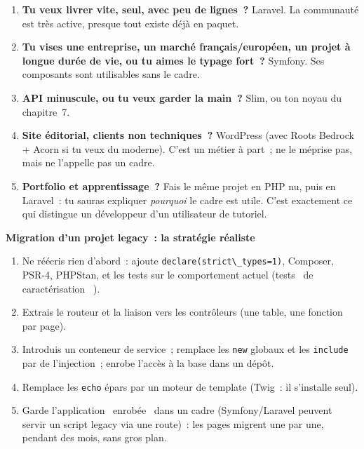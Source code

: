 \documentclass[12pt,a4paper,twoside,openright]{book}
\newcommand{\etape}[1]{\par\medskip\noindent\textbf{\large #1}\par\smallskip}
\begin{document}
\begin{enumerate}
  \item \textbf{Tu veux livrer vite, seul, avec peu de lignes~?} Laravel. La communaut\'e est tr\`es
        active, presque tout existe d\'ej\`a en paquet.
  \item \textbf{Tu vises une entreprise, un march\'e fran\c{c}ais/europ\'een, un projet \`a longue dur\'ee de
        vie, ou tu aimes le typage fort~?} Symfony. Ses composants sont utilisables sans le cadre.
  \item \textbf{API minuscule, ou tu veux garder la main~?} Slim, ou ton noyau du chapitre~7.
  \item \textbf{Site \'editorial, clients non techniques~?} WordPress (avec Roots Bedrock + Acorn si tu veux du moderne). C'est un m\'etier \`a part~; ne le m\'eprise pas, mais ne l'appelle pas un cadre.
  \item \textbf{Portfolio et apprentissage~?} Fais le m\^eme projet en PHP nu, puis en Laravel~: tu
        sauras expliquer \emph{pourquoi} le cadre est utile. C'est exactement ce qui distingue un
        d\'eveloppeur d'un utilisateur de tutoriel.
\end{enumerate}

\etape{Migration d'un projet legacy~: la strat\'egie r\'ealiste}
\begin{enumerate}
  \item Ne r\'e\'ecris rien d'abord~: ajoute \verb|declare(strict\_types=1)|, Composer, PSR-4,
        PHPStan, et les tests sur le comportement actuel (tests \og ~de caract\'erisation~ \fg{}).
  \item Extrais le routeur et la liaison vers les contr\^oleurs (une table, une fonction par page).
  \item Introduis un conteneur de service~; remplace les \verb|new| globaux et les
        \verb|include| par de l'injection~; enrobe l'acc\`es \`a la base dans un d\'ep\^ot.
  \item Remplace les \verb|echo| \'epars par un moteur de template (Twig~: il s'installe seul).
  \item Garde l'application \og ~enrob\'ee~ \fg{} dans un cadre (Symfony/Laravel peuvent servir un script
        legacy via une route)~: les pages migrent une par une, pendant des mois, sans gros plan.
\end{enumerate}
\end{document}

